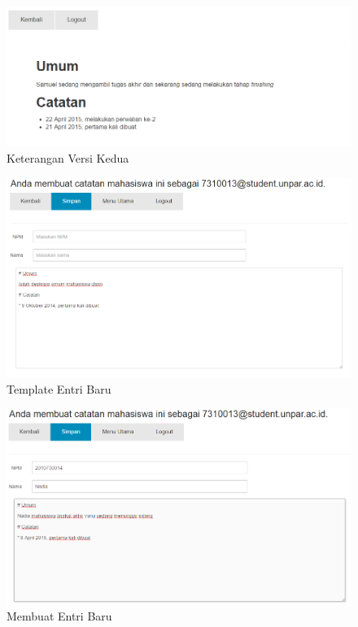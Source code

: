 \begin{figure}[H]
\centering
\includegraphics[scale=0.44]{Gambar/pengujian13.png}
\caption[Keterangan Versi Kedua]{Keterangan Versi Kedua} 
\label{fig:keteranganversikedua}
\end{figure}

\begin{figure}[H]
\centering
\includegraphics[scale=0.44]{Gambar/pengujian14.png}
\caption[Template Entri Baru]{Template Entri Baru} 
\label{fig:templateentribaru}
\end{figure}

\begin{figure}[H]
\centering
\includegraphics[scale=0.44]{Gambar/pengujian15.png}
\caption[Membuat Entri Baru]{Membuat Entri Baru} 
\label{fig:membuatentribaru}
\end{figure}

